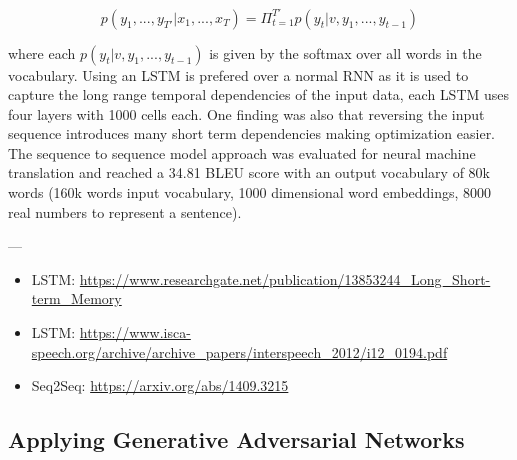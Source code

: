 \begin{equation}
	p(y_1, ..., y_{T'} | x_1, ..., x_{T}) = \Pi_{t=1}^{T'} p(y_t | v, y_1, ..., y_{t-1})
\end{equation}

where each $p(y_t | v, y_1, ..., y_{t-1})$ is given by the softmax over all words in the vocabulary. Using an \ac{LSTM} is prefered over a normal \ac{RNN} as it is used to capture the long range temporal dependencies of the input data, each \ac{LSTM} uses four layers with 1000 cells each. One finding was also that reversing the input sequence introduces many short term dependencies making optimization easier. The sequence to sequence model approach was evaluated for neural machine translation and reached a 34.81 BLEU score with an output vocabulary of 80k words (160k words input vocabulary, 1000 dimensional word embeddings, 8000 real numbers to represent a sentence). 


---

\begin{itemize}
	\item LSTM: \url{https://www.researchgate.net/publication/13853244_Long_Short-term_Memory}
	\item LSTM: \url{https://www.isca-speech.org/archive/archive_papers/interspeech_2012/i12_0194.pdf}
	\item Seq2Seq: \url{https://arxiv.org/abs/1409.3215}
\end{itemize}


\subsection{Applying Generative Adversarial Networks} \label{fundamentalsG}

